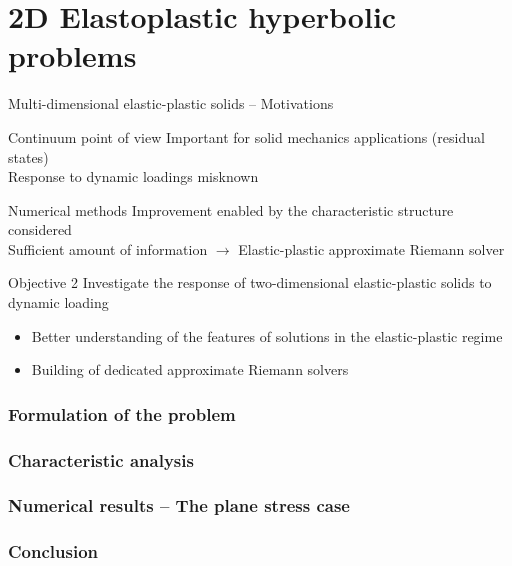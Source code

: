 \documentclass[11pt,aspectratio=169]{beamer}
\makeatletter
\let\oldpart\part
\def\part#1{\def\@currentlabelname{#1}\oldpart{#1}}
\makeatother
\begin{document}
\part{2D Elastoplastic hyperbolic problems}
\label{part:part2}
\begin{frame}{Multi-dimensional elastic-plastic solids -- Motivations}
  
  \begin{block}{Continuum point of view}
    Important for solid mechanics applications (residual states)\\
    Response to dynamic loadings misknown %
  \end{block}
  
  \begin{block}{Numerical methods}
    Improvement enabled by the characteristic structure considered \\
    Sufficient amount of information \alert{$\rightarrow$ Elastic-plastic approximate Riemann solver}
  \end{block}
  \pause
  \begin{block}{Objective 2}
    Investigate the response of two-dimensional elastic-plastic solids to dynamic loading
    \begin{itemize}
    \item Better understanding of the features of solutions in the elastic-plastic regime
    \item Building of dedicated approximate Riemann solvers
    \end{itemize}
  \end{block}
\end{frame}

\section{Formulation of the problem}


\section{Characteristic analysis}


\section{Numerical results -- The plane stress case}



\section*{Conclusion}
\begin{frame}[standout]
  \vskip 5pt
  
\end{frame}

% 
% 
\end{document}
